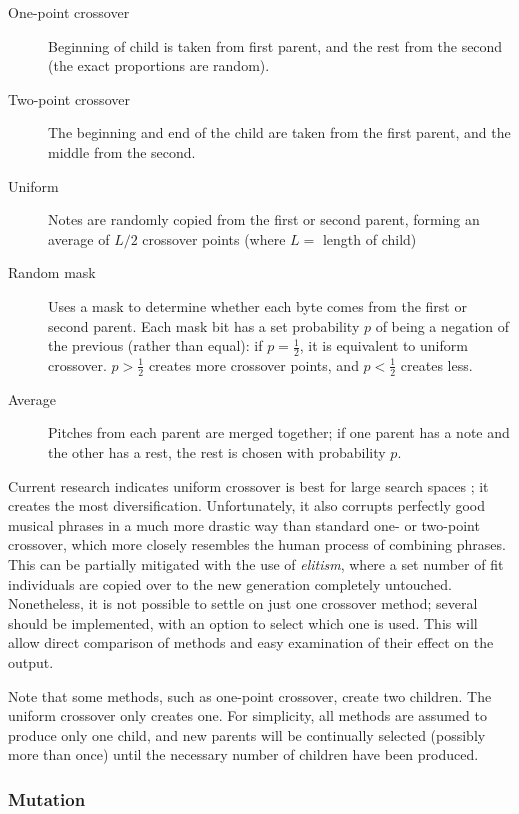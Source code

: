 \begin{description}
\item[One-point crossover] Beginning of child is taken from first parent, and the rest from the second (the exact proportions are random).
\item[Two-point crossover] The beginning and end of the child are taken from the first parent, and the middle from the second.
\item[Uniform] Notes are randomly copied from the first or second parent, forming an average of $L/2$ crossover points (where $L = $ length of child)
\item[Random mask] Uses a mask to determine whether each byte comes from the first or second parent. Each mask bit has a set probability $p$ of being a negation of the previous (rather than equal): if $p = \frac{1}{2}$, it is equivalent to uniform crossover. $p > \frac{1}{2}$ creates more crossover points, and $p < \frac{1}{2}$ creates less.
\item[Average] Pitches from each parent are merged together; if one parent has a note and the other has a rest, the rest is chosen with probability $p$.
\end{description}

Current research indicates uniform crossover is best for large search spaces \citep{sywerda89,spears91}; it creates the most diversification. Unfortunately, it also corrupts perfectly good musical phrases in a much more drastic way than standard one- or two-point crossover, which more closely resembles the human process of combining phrases. This can be partially mitigated with the use of \emph{elitism}, where a set number of fit individuals are copied over to the new generation completely untouched. Nonetheless, it is not possible to settle on just one crossover method; several should be implemented, with an option to select which one is used. This will allow direct comparison of methods and easy examination of their effect on the output.

Note that some methods, such as one-point crossover, create two children. The uniform crossover only creates one. For simplicity, all methods are assumed to produce only one child, and new parents will be continually selected (possibly more than once) until the necessary number of children have been produced.

\subsubsection{Mutation}

